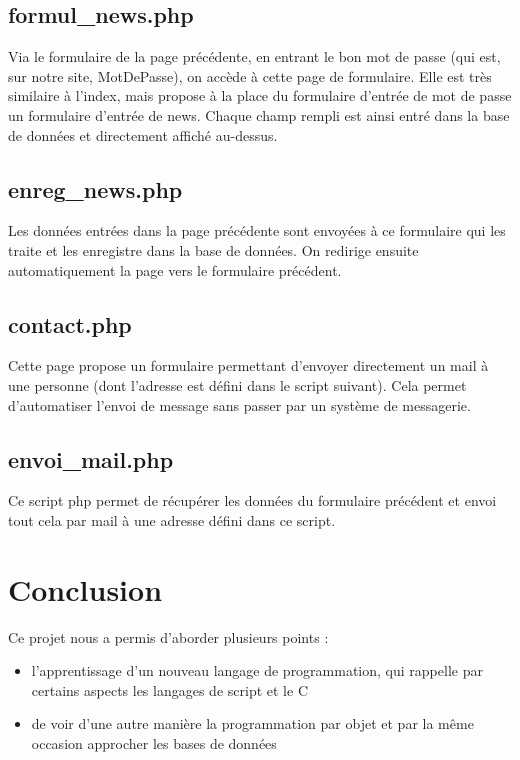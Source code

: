 \documentclass{article}
\begin{document}
\subsection{formul\_news.php}
Via le formulaire de la page précédente, en entrant le bon mot de passe (qui est, sur notre site, MotDePasse), on accède à cette page de formulaire. Elle est très similaire à l'index, mais propose à la place du formulaire d'entrée de mot de passe un formulaire d'entrée de news. Chaque champ rempli est ainsi entré dans la base de données et directement affiché au-dessus.


\subsection{enreg\_news.php}
Les données entrées dans la page précédente sont envoyées à ce formulaire qui les traite et les enregistre dans la base de données. On redirige ensuite automatiquement la page vers le formulaire précédent.


\subsection{contact.php}
Cette page propose un formulaire permettant d'envoyer directement un mail à une personne (dont l'adresse est défini dans le script suivant). Cela permet d'automatiser l'envoi de message sans passer par un système de messagerie.


\subsection{envoi\_mail.php}
Ce script php permet de récupérer les données du formulaire précédent et envoi tout cela par mail à une adresse défini dans ce script.


\newpage
\section*{Conclusion}
Ce projet nous a permis d'aborder plusieurs points : 
\begin{itemize}
	\item l'apprentissage d'un nouveau langage de programmation, qui rappelle par certains aspects les langages de script et le C
	\item de voir d'une autre manière la programmation par objet et par la même occasion approcher les bases de données
\end{itemize}
\end{document}
